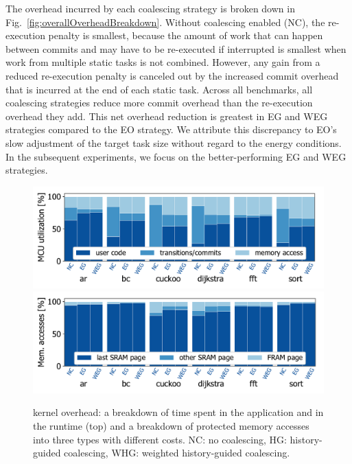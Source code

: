 The overhead incurred by each coalescing strategy is broken down in
Fig.~\ref{fig:overallOverheadBreakdown}. Without coalescing enabled (NC), the
re-execution penalty is smallest, because the amount of work that can happen
between commits and may have to be re-executed if interrupted is smallest when
work from multiple static tasks is not combined.
%
However, any gain from a reduced re-execution penalty is canceled out by
the increased commit overhead that is incurred at the end of each static
task.
%
Across all benchmarks, all coalescing strategies reduce more commit overhead
than the re-execution overhead they add.
%
This net overhead reduction is greatest in EG and WEG strategies compared
to the EO strategy. We attribute this discrepancy to EO's slow adjustment
of the target task size without regard to the energy conditions.
%
In the subsequent experiments, we focus on the better-performing EG and WEG
strategies.
%
\begin{figure}
	\centering
	\includegraphics[width=\columnwidth]{figures/overallOverhead}
	\includegraphics[width=\columnwidth]{figures/memAccess}
	\caption{\sys kernel overhead: a breakdown of time spent in
the application and in the runtime (top) and a breakdown of protected memory
accesses into three types with different costs. NC: no coalescing, HG:
history-guided coalescing, WHG: weighted history-guided coalescing.}
	\label{fig:coalEfficiency}
\end{figure}
%
